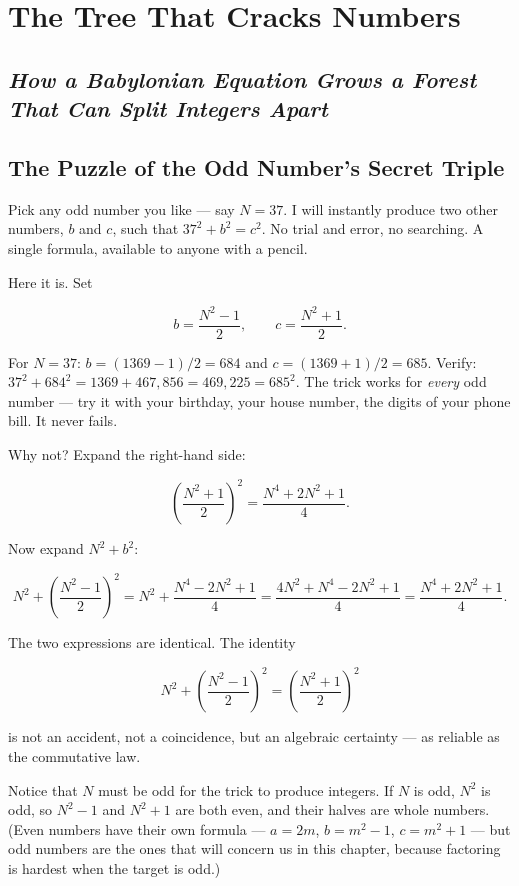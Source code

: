\chapter{The Tree That Cracks Numbers}


\section{\textit{How a Babylonian Equation Grows a Forest That Can Split Integers Apart}}



\ornbreak



\section{The Puzzle of the Odd Number's Secret Triple}


Pick any odd number you like --- say $N = 37$. I will instantly produce two other numbers, $b$ and $c$, such that $37^2 + b^2 = c^2$. No trial and error, no searching. A single formula, available to anyone with a pencil.

Here it is. Set

\[
b = \frac{N^2 - 1}{2}, \qquad c = \frac{N^2 + 1}{2}.
\]

For $N = 37$: $b = (1369 - 1)/2 = 684$ and $c = (1369 + 1)/2 = 685$. Verify: $37^2 + 684^2 = 1369 + 467{,}856 = 469{,}225 = 685^2$. The trick works for \textit{every} odd number --- try it with your birthday, your house number, the digits of your phone bill. It never fails.

Why not? Expand the right-hand side:

\[
\left(\frac{N^2 + 1}{2}\right)^{\!2} = \frac{N^4 + 2N^2 + 1}{4}.
\]

Now expand $N^2 + b^2$:

\[
N^2 + \left(\frac{N^2 - 1}{2}\right)^{\!2} = N^2 + \frac{N^4 - 2N^2 + 1}{4} = \frac{4N^2 + N^4 - 2N^2 + 1}{4} = \frac{N^4 + 2N^2 + 1}{4}.
\]

The two expressions are identical. The identity

\[
N^2 + \left(\frac{N^2 - 1}{2}\right)^{\!2} = \left(\frac{N^2 + 1}{2}\right)^{\!2}
\]

is not an accident, not a coincidence, but an algebraic certainty --- as reliable as the commutative law.

Notice that $N$ must be odd for the trick to produce integers. If $N$ is odd, $N^2$ is odd, so $N^2 - 1$ and $N^2 + 1$ are both even, and their halves are whole numbers. (Even numbers have their own formula --- $a = 2m$, $b = m^2 - 1$, $c = m^2 + 1$ --- but odd numbers are the ones that will concern us in this chapter, because factoring is hardest when the target is odd.)

